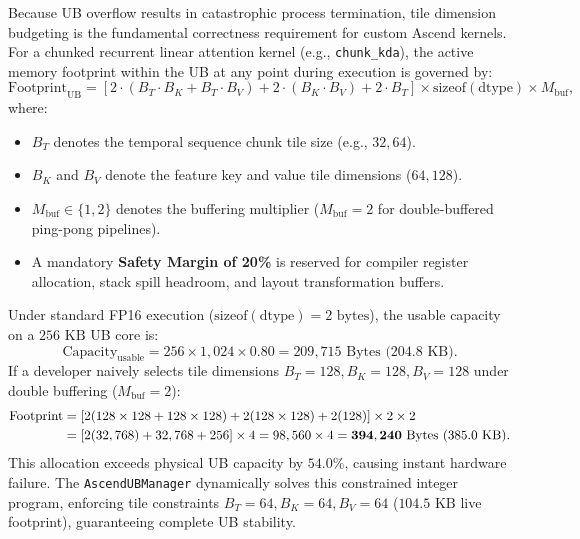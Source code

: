 Because UB overflow results in catastrophic process termination, tile dimension budgeting is the fundamental correctness requirement for custom Ascend kernels. For a chunked recurrent linear attention kernel (e.g., \texttt{chunk\_kda}), the active memory footprint within the UB at any point during execution is governed by:
\begin{equation}
    \text{Footprint}_{\text{UB}} = \left[ 2 \cdot (B_T \cdot B_K + B_T \cdot B_V) + 2 \cdot (B_K \cdot B_V) + 2 \cdot B_T \right] \times \text{sizeof}(\text{dtype}) \times M_{\text{buf}},
    \label{eq:ascend_ub_budget_formula}
\end{equation}
where:
\begin{itemize}
    \item $B_T$ denotes the temporal sequence chunk tile size (e.g., $32, 64$).
    \item $B_K$ and $B_V$ denote the feature key and value tile dimensions ($64, 128$).
    \item $M_{\text{buf}} \in \{1, 2\}$ denotes the buffering multiplier ($M_{\text{buf}} = 2$ for double-buffered ping-pong pipelines).
    \item A mandatory \textbf{Safety Margin of 20\%} is reserved for compiler register allocation, stack spill headroom, and layout transformation buffers.
\end{itemize}

Under standard FP16 execution ($\text{sizeof}(\text{dtype}) = 2\text{ bytes}$), the usable capacity on a $256\text{ KB}$ UB core is:
\begin{equation}
    \text{Capacity}_{\text{usable}} = 256 \times 1,024 \times 0.80 = 209,715\text{ Bytes (204.8 KB)}.
\end{equation}
If a developer naively selects tile dimensions $B_T = 128, B_K = 128, B_V = 128$ under double buffering ($M_{\text{buf}} = 2$):
\begin{align}
    \text{Footprint} &= \left[ 2(128 \times 128 + 128 \times 128) + 2(128 \times 128) + 2(128) \right] \times 2 \times 2 \notag \\
    &= \left[ 2(32,768) + 32,768 + 256 \right] \times 4 = 98,560 \times 4 = \mathbf{394,240\text{ Bytes (385.0 KB)}}.
\end{align}
This allocation exceeds physical UB capacity by \textbf{$54.0\%$}, causing instant hardware failure. The \neuralops{} \texttt{AscendUBManager} dynamically solves this constrained integer program, enforcing tile constraints $B_T = 64, B_K = 64, B_V = 64$ ($104.5\text{ KB}$ live footprint), guaranteeing complete UB stability.

